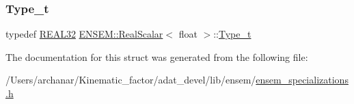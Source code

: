 \mbox{\label{structENSEM_1_1RealScalar_3_01float_01_4_a897db3180e57c127ea66a260ac1d0bc4}} 
\subsubsection{\texorpdfstring{Type\_t}{Type\_t}\hspace{0.1cm}{\footnotesize\ttfamily [2/2]}}
{\footnotesize\ttfamily typedef \mbox{\hyperlink{namespaceENSEM_a7540d01191172323e9073283d772576d}{R\+E\+A\+L32}} \mbox{\hyperlink{structENSEM_1_1RealScalar}{E\+N\+S\+E\+M\+::\+Real\+Scalar}}$<$ float $>$\+::\mbox{\hyperlink{structENSEM_1_1RealScalar_3_01float_01_4_a897db3180e57c127ea66a260ac1d0bc4}{Type\+\_\+t}}}



The documentation for this struct was generated from the following file\+:\begin{DoxyCompactItemize}
\item 
/\+Users/archanar/\+Kinematic\+\_\+factor/adat\+\_\+devel/lib/ensem/\mbox{\hyperlink{lib_2ensem_2ensem__specializations_8h}{ensem\+\_\+specializations.\+h}}\end{DoxyCompactItemize}
